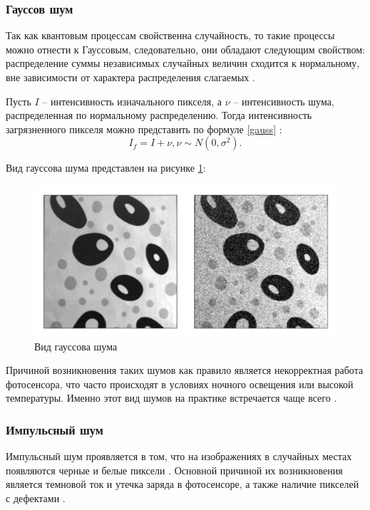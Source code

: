 \subsubsection{Гауссов шум}
Так как квантовым процессам свойственна случайность, то такие процессы можно отнести к Гауссовым, следовательно, они обладают следующим свойством: распределение суммы независимых случайных величин сходится к нормальному, вне зависимости от характера распределения слагаемых \cite{inproceedings}.

Пусть $I$ -- интенсивность изначального пикселя, а $\nu$ -- интенсивность шума, распределенная по нормальному распределению. 
Тогда интенсивность загрязненного пикселя можно представить по формуле \eqref{gauss} \cite{filterTechincs}: 
\begin{equation}
	\label{gauss}
	I_f = I + \nu,  \nu \sim N(0, \sigma^2).
\end{equation}


Вид гауссова шума представлен на рисунке \ref{fig::gaussSh}:
\FloatBarrier
\begin{figure}[h]	
	\begin{center}
		\includegraphics[width=\linewidth]{inc/png/gaussShum.png}
	\end{center}
	\captionsetup{justification=centering}
	\caption{Вид гауссова шума}
	\label{fig::gaussSh}
\end{figure}
\FloatBarrier

Причиной возникновения таких шумов как правило является некорректная работа фотосенсора, что часто происходят в условиях ночного освещения или высокой температуры.
Именно этот вид шумов на практике встречается чаще всего \cite{filterTechincs}. 

\subsubsection{Импульсный шум}
Импульсный шум проявляется в том, что на изображениях в случайных местах появляются черные и белые пиксели \cite{moments}.
Основной причиной их возникновения является темновой ток и утечка заряда в фотосенсоре, а также наличие пикселей с дефектами \cite{shum}.

